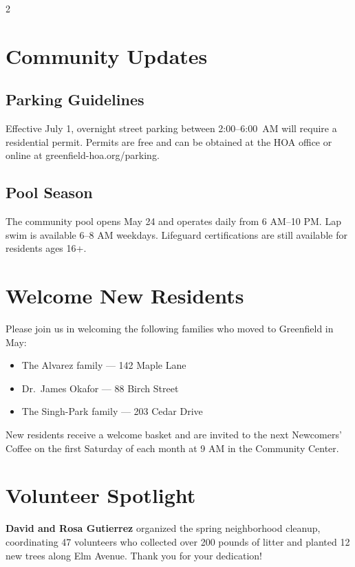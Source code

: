 \documentclass[
    language=english,
    doctype=newsletter,
    institution=none,
]{../../omnilatex}
\begin{document}
\begin{multicols}{2}

\section*{Community Updates}

\subsection*{Parking Guidelines}

Effective July 1, overnight street parking between 2:00--6:00~AM will require
a residential permit. Permits are free and can be obtained at the HOA office or
online at greenfield-hoa.org/parking.

\subsection*{Pool Season}

The community pool opens May 24 and operates daily from 6 AM--10 PM.
Lap swim is available 6--8 AM weekdays. Lifeguard certifications are still
available for residents ages 16+.

\columnbreak

\section*{Welcome New Residents}

Please join us in welcoming the following families who moved to Greenfield in
May:

\begin{itemize}[leftmargin=*, nosep]
    \item The Alvarez family --- 142 Maple Lane
    \item Dr.\ James Okafor --- 88 Birch Street
    \item The Singh-Park family --- 203 Cedar Drive
\end{itemize}

New residents receive a welcome basket and are invited to the next Newcomers'
Coffee on the first Saturday of each month at 9 AM in the Community Center.

\section*{Volunteer Spotlight}

\textbf{David and Rosa Gutierrez} organized the spring neighborhood cleanup,
coordinating 47 volunteers who collected over 200 pounds of litter and planted
12 new trees along Elm Avenue. Thank you for your dedication!

\end{multicols}
\end{document}
